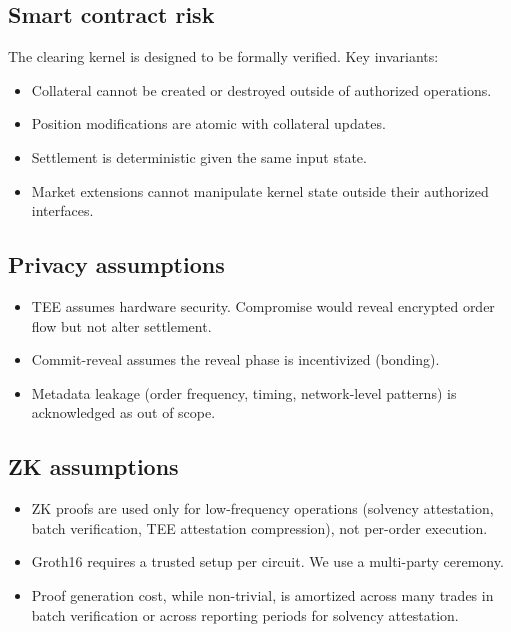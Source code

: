 \documentclass[11pt,a4paper]{article}
\begin{document}
\subsection{Smart contract risk}

The clearing kernel is designed to be formally verified. Key invariants:
\begin{itemize}
  \item Collateral cannot be created or destroyed outside of authorized operations.
  \item Position modifications are atomic with collateral updates.
  \item Settlement is deterministic given the same input state.
  \item Market extensions cannot manipulate kernel state outside their authorized interfaces.
\end{itemize}

\subsection{Privacy assumptions}

\begin{itemize}
  \item TEE assumes hardware security. Compromise would reveal encrypted order flow but not alter settlement.
  \item Commit-reveal assumes the reveal phase is incentivized (bonding).
  \item Metadata leakage (order frequency, timing, network-level patterns) is acknowledged as out of scope.
\end{itemize}

\subsection{ZK assumptions}

\begin{itemize}
  \item ZK proofs are used only for low-frequency operations (solvency attestation, batch verification, TEE attestation compression), not per-order execution.
  \item Groth16 requires a trusted setup per circuit. We use a multi-party ceremony.
  \item Proof generation cost, while non-trivial, is amortized across many trades in batch verification or across reporting periods for solvency attestation.
\end{itemize}
\end{document}
